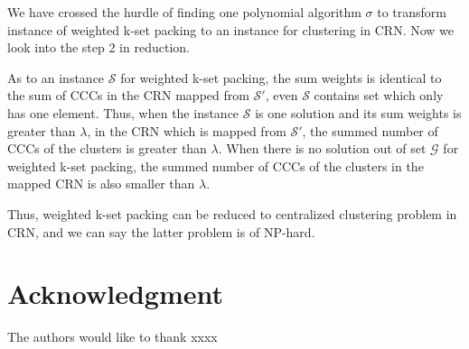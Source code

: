 \documentclass[10pt,journal,compsoc]{IEEEtran}
\makeatletter
\theoremstyle{mytheoremstyle}
\theoremstyle{mytheoremstyle}
\theoremstyle{mytheoremstyle}
\renewenvironment{proof}[1][\proofname]{%
      \par\pushQED{\qed}\fontfamily{ptm}\selectfont%
      \topsep6\p@\@plus6\p@\relax
      \trivlist\item[\hskip\labelsep\bfseries#1\@addpunct{.}]%
      \ignorespaces
    }{%
      \popQED\endtrivlist\@endpefalse
    }
\makeatother
\begin{document}
\begin{proof}
\begin{itemize}

\end{itemize}

We have crossed the hurdle of finding one polynomial algorithm $\sigma$ to transform instance of weighted k-set packing to an instance for clustering in CRN.
Now we look into the step 2 in reduction.

As to an instance $\mathcal{S}$ for weighted k-set packing, the sum weights is identical to the sum of CCCs in the CRN mapped from $\mathcal{S'}$, even $\mathcal{S}$ contains set which only has one element.
Thus, when the instance $\mathcal{S}$ is one solution and its sum weights is greater than $\lambda$, in the CRN which is mapped from $\mathcal{S'}$, the summed number of CCCs of the clusters is greater than $\lambda$.
%
When there is no solution out of set $\mathcal{G}$ for weighted k-set packing,
the summed number of CCCs of the clusters in the mapped CRN is also smaller than $\lambda$.

Thus, weighted k-set packing can be reduced to centralized clustering problem in CRN, and we can say the latter problem is of NP-hard.
\end{proof}


\section*{Acknowledgment}

The authors would like to thank xxxx
\end{document}
